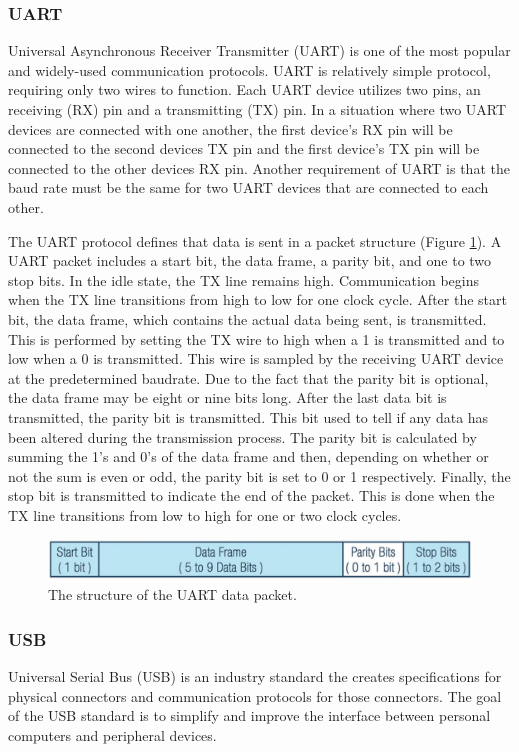 \subsubsection{UART}
Universal Asynchronous Receiver Transmitter (UART) is one of the most popular and widely-used communication protocols. UART is relatively simple protocol, requiring only two wires to function. Each UART device utilizes two pins, an receiving (RX) pin and a transmitting (TX) pin. In a situation where two UART devices are connected with one another, the first device's RX pin will be connected to the second devices TX pin and the first device's TX pin will be connected to the other devices RX pin. Another requirement of UART is that the baud rate must be the same for two UART devices that are connected to each other.

The UART protocol defines that data is sent in a packet structure (Figure \ref{fig:uart-data-packet}). A UART packet includes a start bit, the data frame, a parity bit, and one to two stop bits. In the idle state, the TX line remains high. Communication begins when the TX line transitions from high to low for one clock cycle. After the start bit, the data frame, which contains the actual data being sent, is transmitted. This is performed by setting the TX wire to high when a 1 is transmitted and to low when a 0 is transmitted. This wire is sampled by the receiving UART device at the predetermined baudrate. Due to the fact that the parity bit is optional, the data frame may be eight or nine bits long. After the last data bit is transmitted, the parity bit is transmitted. This bit used to tell if any data has been altered during the transmission process. The parity bit is calculated by summing the 1's and 0's of the data frame and then, depending on whether or not the sum is even or odd, the parity bit is set to 0 or 1 respectively. Finally, the stop bit is transmitted to indicate the end of the packet. This is done when the TX line transitions from low to high for one or two clock cycles.

\begin{figure}
    \centering
    \includegraphics[width=6in]{figures/uart-data-packet.png}
    \caption{The structure of the UART data packet.}
    \label{fig:uart-data-packet}
\end{figure}

\subsubsection{USB}
Universal Serial Bus (USB) is an industry standard the creates specifications for physical connectors and communication protocols for those connectors. The goal of the USB standard is to simplify and improve the interface between personal computers and peripheral devices.

